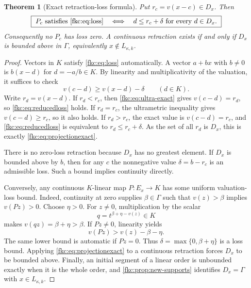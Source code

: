 \documentclass[11pt,letterpaper]{article}
\numberwithin{equation}{section}
\newtheorem{theorem}{Theorem}[section]
\theoremstyle{definition}
\theoremstyle{remark}
\begin{document}
\begin{theorem}[Exact retraction-loss formula]\label{fkc:thm:projection}
Put $r_c=v(x-c)\in D_x$. Then
\begin{equation}\label{fkc:eq:projectionexact}
 \boxed{\ P_c\text{ satisfies \eqref{fkc:eq:loss}}
 \quad\Longleftrightarrow\quad
 d\le r_c+\delta\text{ for every }d\in D_x.\ }
\end{equation}
Consequently no $P_c$ has loss zero. A continuous retraction exists if and only if $D_x$ is bounded above in $\Gamma$, equivalently $x\notin L_{\kappa,k}$.
\end{theorem}
\begin{proof}
Vectors in $K$ satisfy \eqref{fkc:eq:loss} automatically. A vector $a+bx$ with $b\ne0$ is $b(x-d)$ for $d=-a/b\in K$. By linearity and multiplicativity of the valuation, it suffices to check
\begin{equation}\label{fkc:eq:reducedloss}
 v(c-d)\ge v(x-d)-\delta\qquad(d\in K).
\end{equation}
Write $r_d=v(x-d)$. If $r_d<r_c$, then \eqref{fkc:eq:ultra-exact} gives $v(c-d)=r_d$, so \eqref{fkc:eq:reducedloss} holds. If $r_d=r_c$, the ultrametric inequality gives $v(c-d)\ge r_c$, so it also holds. If $r_d>r_c$, the exact value is $v(c-d)=r_c$, and \eqref{fkc:eq:reducedloss} is equivalent to $r_d\le r_c+\delta$. As the set of all $r_d$ is $D_x$, this is exactly \eqref{fkc:eq:projectionexact}.

There is no zero-loss retraction because $D_x$ has no greatest element. If $D_x$ is bounded above by $b$, then for any $c$ the nonnegative value $\delta=b-r_c$ is an admissible loss. Such a bound implies continuity directly.

Conversely, any continuous $K$-linear map $P:E_x\to K$ has some uniform valuation-loss bound. Indeed, continuity at zero supplies $\beta\in\Gamma$ such that $v(z)>\beta$ implies $v(Pz)>0$. Choose $\eta>0$. For $z\ne0$, multiplication by the scalar
\[
 q=t^{\beta+\eta-v(z)}\in K
\]
makes $v(qz)=\beta+\eta>\beta$. If $Pz\ne0$, linearity yields
\[
 v(Pz)>v(z)-\beta-\eta.
\]
The same lower bound is automatic if $Pz=0$. Thus $\delta=\max\{0,\beta+\eta\}$ is a loss bound. Applying \eqref{fkc:eq:projectionexact} to a continuous retraction forces $D_x$ to be bounded above. Finally, an initial segment of a linear order is unbounded exactly when it is the whole order, and \cref{fkc:prop:new-supports} identifies $D_x=\Gamma$ with $x\in L_{\kappa,k}$.
\end{proof}
\end{document}
